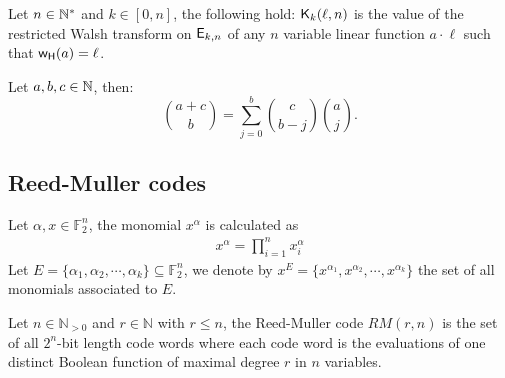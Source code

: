 \documentclass[11pt]{llncs}
\begin{document}
\begin{Prop}\label{prop:Kr}
	Let $n\in \mathbb{N}^*$ and $k\in [0,n]$, the following hold:
 $\mathsf{K}_{k}(\ell,n)$ is the value of the restricted Walsh transform on $\mathsf{E}_{k,n}$ of any $n$ variable linear function $a\cdot \ell$ such that $\mathsf{w_H}(a)=\ell$.
\end{Prop}


\begin{Prop}\label{prop:Vandermonde}
	Let $a,b,c \in \mathbb{N}$, then:
	\begin{equation*}
	\binom{a+c}{b}=\sum_{j=0}^b\binom{c}{b-j}  \binom{a}{j}.
	\end{equation*}
\end{Prop}




\subsection{Reed-Muller codes}

\begin{definition}
    Let $\alpha,x\in \mathbb{F}_2^n$, the monomial $x^{\alpha}$ is calculated as
    \begin{align*}
        x^{\alpha} = \prod_{i=1}^n x^\alpha_i
    \end{align*}
    Let $E = \{\alpha_1, \alpha_2, \cdots, \alpha_k\} \subseteq \mathbb{F}_2^n$, we denote by $x^E = \{x^{\alpha_1}, x^{\alpha_2}, \cdots, x^{\alpha_k}\}$ the set of all monomials associated to $E$.
\end{definition}

\begin{definition}
	Let $n\in \mathbb{N}_{>0}$ and $r\in \mathbb{N}$ with $r\leq n$, the Reed-Muller code $RM(r,n)$ is the set of all $2^n$-bit length code words where each code word is the evaluations of one distinct Boolean function of maximal degree $r$ in $n$ variables.
\end{definition}
\end{document}
